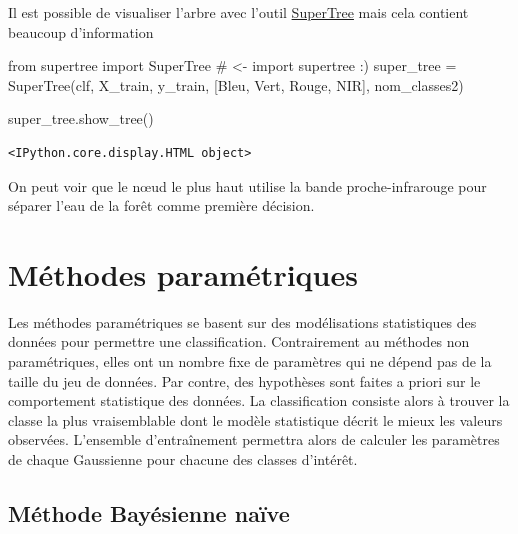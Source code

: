 \documentclass[
  french,
  11pt,
  letterpaper,
  open=any,
  twoside=false,
  french]{scrbook}
\newenvironment{Shaded}{\begin{snugshade}}{\end{snugshade}}
\newcommand{\CommentTok}[1]{\textcolor[rgb]{0.37,0.37,0.37}{#1}}
\newcommand{\ImportTok}[1]{\textcolor[rgb]{0.00,0.46,0.62}{#1}}
\newcommand{\NormalTok}[1]{\textcolor[rgb]{0.00,0.23,0.31}{#1}}
\newcommand{\OperatorTok}[1]{\textcolor[rgb]{0.37,0.37,0.37}{#1}}
\newcommand{\StringTok}[1]{\textcolor[rgb]{0.13,0.47,0.30}{#1}}
\begin{document}
Il est possible de visualiser l'arbre avec l'outil
\href{https://github.com/mljar/supertree?tab=readme-ov-file}{SuperTree}
mais cela contient beaucoup d'information

\begin{Shaded}
\begin{Highlighting}[]
\ImportTok{from}\NormalTok{ supertree }\ImportTok{import}\NormalTok{ SuperTree }\CommentTok{\# \textless{}{-} import supertree :)}
\NormalTok{super\_tree }\OperatorTok{=}\NormalTok{ SuperTree(clf, X\_train, y\_train, [}\StringTok{\textquotesingle{}Bleu\textquotesingle{}}\NormalTok{, }\StringTok{\textquotesingle{}Vert\textquotesingle{}}\NormalTok{, }\StringTok{\textquotesingle{}Rouge\textquotesingle{}}\NormalTok{, }\StringTok{\textquotesingle{}NIR\textquotesingle{}}\NormalTok{], nom\_classes2)}

\NormalTok{super\_tree.show\_tree()}
\end{Highlighting}
\end{Shaded}

\begin{verbatim}
<IPython.core.display.HTML object>
\end{verbatim}

On peut voir que le nœud le plus haut utilise la bande proche-infrarouge
pour séparer l'eau de la forêt comme première décision.

\section{Méthodes paramétriques}\label{muxe9thodes-paramuxe9triques}

Les méthodes paramétriques se basent sur des modélisations statistiques
des données pour permettre une classification. Contrairement au méthodes
non paramétriques, elles ont un nombre fixe de paramètres qui ne dépend
pas de la taille du jeu de données. Par contre, des hypothèses sont
faites a priori sur le comportement statistique des données. La
classification consiste alors à trouver la classe la plus vraisemblable
dont le modèle statistique décrit le mieux les valeurs observées.
L'ensemble d'entraînement permettra alors de calculer les paramètres de
chaque Gaussienne pour chacune des classes d'intérêt.

\subsection{Méthode Bayésienne
naïve}\label{muxe9thode-bayuxe9sienne-nauxefve}
\end{document}
